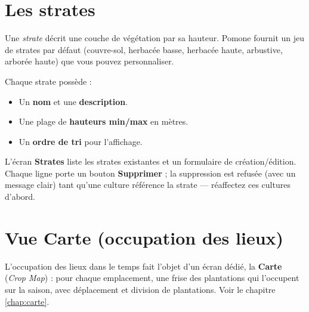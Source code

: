 \section{Les strates}
\label{sec:strates}

Une \emph{strate} décrit une couche de végétation par sa hauteur. Pomone fournit un jeu de strates par défaut (couvre-sol, herbacée basse, herbacée haute, arbustive, arborée haute) que vous pouvez personnaliser.

Chaque strate possède :

\begin{itemize}
  \item Un \textbf{nom} et une \textbf{description}.
  \item Une plage de \textbf{hauteurs min/max} en mètres.
  \item Un \textbf{ordre de tri} pour l'affichage.
\end{itemize}

L'écran \textbf{Strates} liste les strates existantes et un formulaire de création/édition. Chaque ligne porte un bouton \textbf{Supprimer} ; la suppression est refusée (avec un message clair) tant qu'une culture référence la strate — réaffectez ces cultures d'abord.

\section{Vue Carte (occupation des lieux)}

L'occupation des lieux dans le temps fait l'objet d'un écran dédié, la \textbf{Carte} (\emph{Crop Map}) : pour chaque emplacement, une frise des plantations qui l'occupent sur la saison, avec déplacement et division de plantations. Voir le chapitre \ref{chap:carte}.
